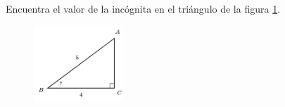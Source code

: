 \question[15]  Encuentra el valor de la incógnita en el triángulo de la figura \ref{fig:angle_functrig_14}.
\begin{figure}[H]
    \begin{center}
        \includegraphics[width=0.3\textwidth]{../images/angle_functrig_14.png}
    \end{center}
    \caption{}
    \label{fig:angle_functrig_14}
\end{figure}